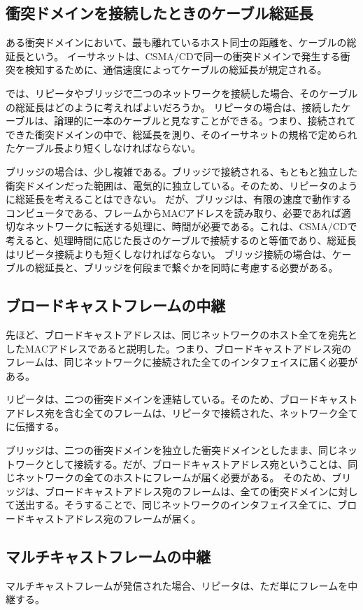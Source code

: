\subsection{衝突ドメインを接続したときのケーブル総延長}

ある衝突ドメインにおいて、最も離れているホスト同士の距離を、ケーブルの総延長という。
イーサネットは、CSMA/CDで同一の衝突ドメインで発生する衝突を検知するために、通信速度によってケーブルの総延長が規定される。

では、リピータやブリッジで二つのネットワークを接続した場合、そのケーブルの総延長はどのように考えればよいだろうか。
リピータの場合は、接続したケーブルは、論理的に一本のケーブルと見なすことができる。つまり、接続されてできた衝突ドメインの中で、総延長を測り、そのイーサネットの規格で定められたケーブル長より短くしなければならない。

ブリッジの場合は、少し複雑である。ブリッジで接続される、もともと独立した衝突ドメインだった範囲は、電気的に独立している。そのため、リピータのように総延長を考えることはできない。
だが、ブリッジは、有限の速度で動作するコンピュータである、フレームからMACアドレスを読み取り、必要であれば適切なネットワークに転送する処理に、時間が必要である。これは、CSMA/CDで考えると、処理時間に応じた長さのケーブルで接続するのと等価であり、総延長はリピータ接続よりも短くしなければならない。
ブリッジ接続の場合は、ケーブルの総延長と、ブリッジを何段まで繋ぐかを同時に考慮する必要がある。

\subsection{ブロードキャストフレームの中継}
先ほど、ブロードキャストアドレスは、同じネットワークのホスト全てを宛先としたMACアドレスであると説明した。つまり、ブロードキャストアドレス宛のフレームは、同じネットワークに接続された全てのインタフェイスに届く必要がある。

リピータは、二つの衝突ドメインを連結している。そのため、ブロードキャストアドレス宛を含む全てのフレームは、リピータで接続された、ネットワーク全てに伝播する。

ブリッジは、二つの衝突ドメインを独立した衝突ドメインとしたまま、同じネットワークとして接続する。だが、ブロードキャストアドレス宛ということは、同じネットワークの全てのホストにフレームが届く必要がある。
そのため、ブリッジは、ブロードキャストアドレス宛のフレームは、全ての衝突ドメインに対して送出する。そうすることで、同じネットワークのインタフェイス全てに、ブロードキャストアドレス宛のフレームが届く。

\subsection{マルチキャストフレームの中継}
マルチキャストフレームが発信された場合、リピータは、ただ単にフレームを中継する。

